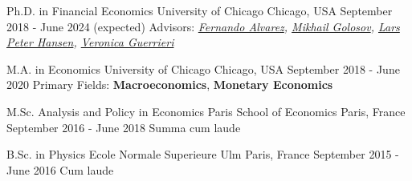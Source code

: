 

\begin{cventries}

	\cventry
	{Ph.D. in Financial Economics} %
	{University of Chicago} %
	{Chicago, USA} %
	{September 2018 - June 2024 (expected)} %
	{Advisors: \textit{\href{https://alvarezfernando.com/}{Fernando Alvarez}, \href{https://voices.uchicago.edu/golosov/contact/}{Mikhail Golosov}, \href{https://larspeterhansen.org/contact/}{Lars Peter Hansen}, \href{https://voices.uchicago.edu/veronicaguerrieri/contact/}{Veronica Guerrieri}}}

	\cventry
	{M.A. in Economics} %
	{University of Chicago} %
	{Chicago, USA} %
	{September 2018 - June 2020} %
	{Primary Fields:
		\textbf{Macroeconomics}, \textbf{Monetary Economics}
	}

	\cventry
	{M.Sc. Analysis and Policy in Economics} %
	{Paris School of Economics} %
	{Paris, France} %
	{September 2016 - June 2018} %
	{Summa cum laude}

	\cventry
	{B.Sc. in Physics} %
	{Ecole Normale Superieure Ulm} %
	{Paris, France} %
	{September 2015 - June 2016} %
	{Cum laude}

\end{cventries}
